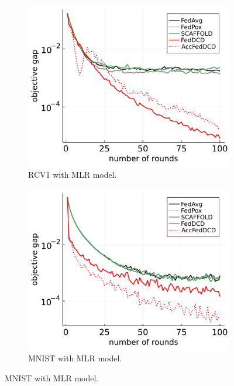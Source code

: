 \begin{figure}[t]
    \begin{subfigure}{.33\textwidth}
      \centering
      \includegraphics[width=\linewidth]{./figures/exp1_rcv1_mlr.pdf}
      \caption{RCV1 with MLR model.}
      \label{fig:exp1_rcv1_mlr}
    \end{subfigure}%
    \begin{subfigure}{.33\textwidth}
      \centering
      \includegraphics[width=\linewidth]{./figures/exp1_mnist_mlr.pdf}
      \caption{MNIST with MLR model.}
      \label{fig:exp1_mnist_mlr}
    \end{subfigure}

\end{figure}
